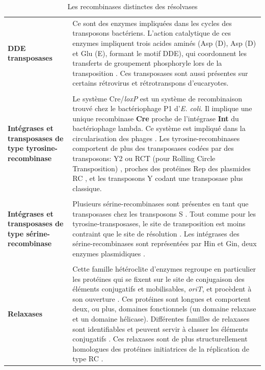 \begin{longtable}{@{\hspace{-3cm}\hspace{1cm}} >{\bfseries}p{} | >{\small}p{}}
	\caption{Les recombinases distinctes des résolvases}\label{MGE}\\
	\endfirsthead
	DDE transposases & Ce sont des enzymes impliquées dans les cycles des transposons bactériens. L'action catalytique de ces enzymes impliquent trois acides aminés (Asp (D), Asp (D) et Glu (E), formant le motif DDE), qui coordonnent les transferts de groupement phosphoryle lors de la transposition \citep{higgins2005bacterial}. Ces transposases sont aussi présentes sur certains rétrovirus et rétrotranspons d'eucaryotes.\\
	\\[-0.2cm]
	Intégrases et transposases de type tyrosine-recombinase & Le système Cre/\textit{loxP} est un système de recombinaison trouvé chez le bactériophage P1 d'\textit{E. coli}. Il implique une unique recombinase \textbf{Cre} proche de l'intégrase \textbf{Int} du bactériophage lambda. Ce système est impliqué dans la circularisation des phages \citep{hallet2004dna}. Les tyrosine-recombinases comportent de plus des transposases codées par des transposons: Y2 ou RCT (pour Rolling Circle Transposition) \citep{higgins2005bacterial}, proches des protéines Rep des plasmides RC \citep{cornet2004non}, et les transposons Y codant une transposase plus classique.\\
	\\[-0.2cm]
	Intégrases et transposases de type sérine-recombinase & Plusieurs sérine-recombinases sont présentes en tant que transposases chez les transposons S \citep{higgins2005bacterial}. Tout comme pour les tyrosine-transposases, le site de transposition est moins contraint que le site de résolution \citep{cornet2004non}. Les intégrases des sérine-recombinases sont représentées par Hin et Gin, deux enzymes plasmidiques \citep{cornet2004non}. \\ 
	\\[-0.2cm]
 Relaxases & Cette famille hétéroclite d'enzymes regroupe en particulier les protéines qui se fixent sur le site de conjugaison des éléments conjugatifs et mobilisables, \textit{oriT}, et procèdent à son ouverture \citep{Guglielmini2013}. Ces protéines sont longues et comportent deux, ou plus, domaines fonctionnels (un domaine relaxase et un domaine hélicase). Différentes familles de relaxases sont identifiables et peuvent servir à classer les éléments conjugatifs \citep{Guglielmini2013}. Ces relaxases sont de plus structurellement homologues des protéines initiatrices de la réplication de type RC \citep{Smillie2010}.
\end{longtable}
 
